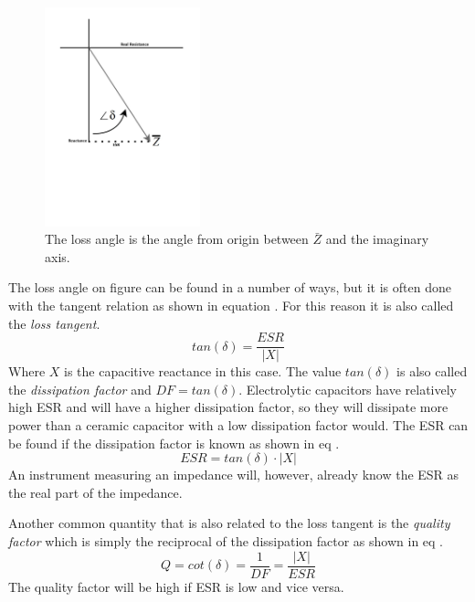 \begin{figure}[H]
    \centering
    \includegraphics[clip, trim=0 275 0 0, width=0.4\textwidth]{Sections/4_TechnicalAnalysis/Figures/4_1_4_LossTangent2.pdf}
    \caption{The loss angle is the angle from origin between $\bar Z$ and the imaginary axis.}
    \label{fig:4_1_1_LossTangent2}
\end{figure}

The loss angle on figure  can be found in a number of ways, but it is often done with the tangent relation as shown in equation . For this reason it is also called the \textit{loss tangent}.
\begin{equation}\label{eq:4_1_1_LossAngle}
    tan(\delta) =\frac{ESR}{|X|} 
\end{equation}
Where $X$ is the capacitive reactance in this case. The value $tan(\delta)$ is also called the \textit{dissipation factor} and $DF = tan(\delta)$. Electrolytic capacitors have relatively high ESR and will have a higher dissipation factor, so they will dissipate more power than a ceramic capacitor with a low dissipation factor would. The ESR can be found if the dissipation factor is known as shown in eq .
\begin{equation}\label{eq:4_1_1_ESR}
    ESR =  tan(\delta)\cdot |X|
\end{equation}
An instrument measuring an impedance will, however, already know the ESR as the real part of the impedance.

Another common quantity that is also related to the loss tangent is the \textit{quality factor} which is simply the reciprocal of the dissipation factor as shown in eq .
\begin{equation}\label{eq:4_1_1_Q}
    Q = cot(\delta) = \frac{1}{DF} = \frac{|X|}{ESR}
\end{equation}
The quality factor will be high if ESR is low and vice versa.



